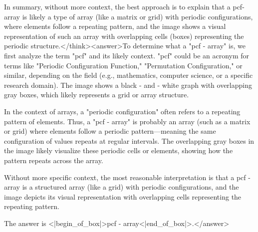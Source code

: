 In summary, without more context, the best approach is to explain that a pcf-array is likely a type of array (like a matrix or grid) with periodic configurations, where elements follow a repeating pattern, and the image shows a visual representation of such an array with overlapping cells (boxes) representing the periodic structure.</think><answer>To determine what a "pcf - array" is, we first analyze the term "pcf" and its likely context. "pcf" could be an acronym for terms like "Periodic Configuration Function," "Permutation Configuration," or similar, depending on the field (e.g., mathematics, computer science, or a specific research domain). The image shows a black - and - white graph with overlapping gray boxes, which likely represents a grid or array structure.  

In the context of arrays, a "periodic configuration" often refers to a repeating pattern of elements. Thus, a "pcf - array" is probably an array (such as a matrix or grid) where elements follow a periodic pattern—meaning the same configuration of values repeats at regular intervals. The overlapping gray boxes in the image likely visualize these periodic cells or elements, showing how the pattern repeats across the array.  

Without more specific context, the most reasonable interpretation is that a pcf - array is a structured array (like a grid) with periodic configurations, and the image depicts its visual representation with overlapping cells representing the repeating pattern.  

The answer is <|begin_of_box|>pcf - array<|end_of_box|>.</answer>